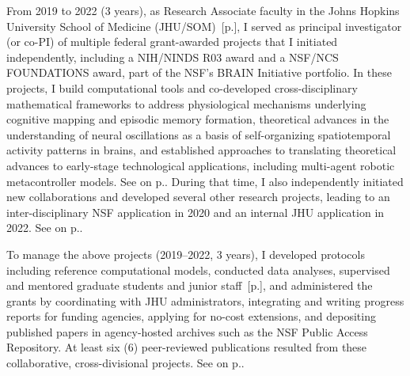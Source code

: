 \documentclass[10pt]{article}
\newcommand{\see}[1]{[\textcolor{hopkinsblue}{p.\pageref{sec:#1}}]}
\newcommand{\cf}[1]{\textcolor{hopkinsblue}{See \emph{\nameref{sec:#1}} on p.\pageref{sec:#1}}}
\begin{document}
From 2019 to 2022 (3 years), as Research Associate faculty in the Johns
Hopkins University School of Medicine (JHU/SOM)~\see{job1}, I served as
principal investigator (or co-PI) of multiple federal grant-awarded projects
that I initiated independently, including a NIH/NINDS R03 award and a NSF/NCS
FOUNDATIONS award, part of the NSF's BRAIN Initiative portfolio. In these
projects, I build computational tools and co-developed cross-disciplinary
mathematical frameworks to address physiological mechanisms underlying
cognitive mapping and episodic memory formation, theoretical advances in
the understanding of neural oscillations as a basis of self-organizing
spatiotemporal activity patterns in brains, and established approaches to
translating theoretical advances to early-stage technological applications,
including multi-agent robotic metacontroller models. \cf{funding}. During that
time, I also independently initiated new collaborations and developed several
other research projects, leading to an inter-disciplinary NSF application in 2020
and an internal JHU application in 2022. \cf{res}.

To manage the above projects (2019--2022, 3 years), I developed protocols
including reference computational models, conducted data analyses, supervised
and mentored graduate students and junior staff~\see{mentoring}, and
administered the grants by coordinating with JHU administrators, integrating and
writing progress reports for funding agencies, applying for no-cost extensions,
and depositing published papers in agency-hosted archives such as the NSF Public
Access Repository. At least six (6) peer-reviewed publications resulted from
these collaborative, cross-divisional projects. \cf{hadzicpub}.
%
\end{document}
